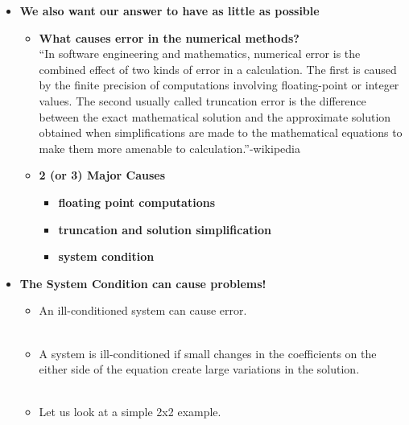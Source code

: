 \documentclass[11pt]{article}
\newcommand{\B}{\color{blue}}
\newcommand{\PR}{\color{mypurple}}
\begin{document}
\begin{itemize}
\newpage
\Large
\item \textbf{ We also want our answer to have as little  as possible} \\
	\begin{itemize}
		\item \textbf{What causes error in the numerical methods?} \\
			``In software engineering and mathematics, numerical error is the combined effect of two kinds of error in a calculation. The first is caused by the finite precision of computations involving floating-point or integer values. The second usually called truncation error is the difference between the exact mathematical solution and the approximate solution obtained when simplifications are made to the mathematical equations to make them more amenable to calculation.''-wikipedia\\
		\item \textbf{2 (or 3) Major Causes} \\
			\begin{itemize}
				\item \textbf{floating point computations} \vspace{20mm}\\
				\item \textbf{truncation and solution simplification} \vspace{20mm}\\
				\item \textbf{system condition} \vspace{20mm}\\
			\end{itemize}
	\end{itemize}

\newpage
\item \textbf{ The {\B System Condition} can cause problems!} \\
\begin{itemize}
	\item An {\PR ill-conditioned} system can cause error. \\\\
	
	\item A system is {\PR ill-conditioned} if small changes in the coefficients on the either side of the equation create large variations in the solution.\\\\

	\item Let us look at a simple 2x2 example. \\\\
	

\end{itemize}
\end{itemize}
\end{document}
